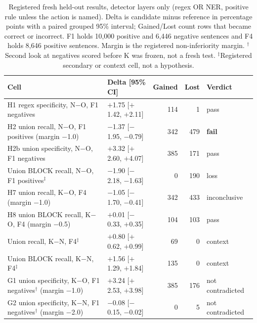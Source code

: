 \documentclass[sigconf]{acmart}
\theoremstyle{acmdefinition}\newtheorem{property}{Property}
\begin{document}
\begin{table}[!t]
\centering
\caption{Registered fresh held-out results, detector layers only (regex OR NER, positive rule unless the action is named). Delta is candidate minus reference in percentage points with a paired grouped 95\% interval; Gained/Lost count rows that became correct or incorrect. F1 holds 10,000 positive and 6,446 negative sentences and F4 holds 8,646 positive sentences. Margin is the registered non-inferiority margin. $^\dagger$Second look at negatives scored before K was frozen, not a fresh test. $^\ddagger$Registered secondary or context cell, not a hypothesis.}
\label{tab:heldout}
\small
\setlength{\tabcolsep}{4pt}
\begin{tabular}{llrrl}
\toprule
Cell & Delta [95\% CI] & Gained & Lost & Verdict \\
\midrule
H1 regex specificity, N$-$O, F1 negatives & $+$1.75 [$+$1.42, $+$2.11] & 114 & 1 & pass \\
H2 union recall, N$-$O, F1 positives (margin $-$1.0) & $-$1.37 [$-$1.95, $-$0.79] & 342 & 479 & \textbf{fail} \\
H2b union specificity, N$-$O, F1 negatives & $+$3.32 [$+$2.60, $+$4.07] & 385 & 171 & pass \\
Union BLOCK recall, N$-$O, F1 positives$^\ddagger$ & $-$1.90 [$-$2.18, $-$1.63] & 0 & 190 & loss \\
\midrule
H7 union recall, K$-$O, F4 (margin $-$1.0) & $-$1.05 [$-$1.70, $-$0.41] & 342 & 433 & inconclusive \\
H8 union BLOCK recall, K$-$O, F4 (margin $-$0.5) & $+$0.01 [$-$0.33, $+$0.35] & 104 & 103 & pass \\
Union recall, K$-$N, F4$^\ddagger$ & $+$0.80 [$+$0.62, $+$0.99] & 69 & 0 & context \\
Union BLOCK recall, K$-$N, F4$^\ddagger$ & $+$1.56 [$+$1.29, $+$1.84] & 135 & 0 & context \\
G1 union specificity, K$-$O, F1 negatives$^\dagger$ (margin $-$1.0) & $+$3.24 [$+$2.53, $+$3.98] & 385 & 176 & not contradicted \\
G2 union specificity, K$-$N, F1 negatives$^\dagger$ (margin $-$2.0) & $-$0.08 [$-$0.15, $-$0.02] & 0 & 5 & not contradicted \\
\bottomrule
\end{tabular}
\end{table}
\end{document}
